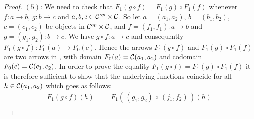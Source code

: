 \begin{proof}
    $(5)$: We need to check that $F_{1}(g\circ f)=F_{1}(g)\circ F_{1}(f)$ 
    whenever $f:a\to b$, $g:b\to c$ and $a,b,c\in\mbox{${\cal C}^{op}$}\times\mbox{$\cal C$}$. So let
    $a=(a_{1},a_{2})$, $b=(b_{1},b_{2})$, $c=(c_{1},c_{2})$ be objects
    in $\mbox{${\cal C}^{op}$}\times\mbox{$\cal C$}$, and $f=(f_{1},f_{1}):a\to b$ and $g=(g_{1},g_{2}):
    b\to c$. We have $g\circ f:a \to c$ and consequently $F_{1}(g\circ f):
    F_{0}(a)\to F_{0}(c)$. Hence the arrows $F_{1}(g\circ f)$ and
    $F_{1}(g)\circ F_{1}(f)$ are two arrows in \Set, with domain
    $F_{0}(a)=\mbox{$\cal C$}(a_{1},a_{2})$ and codomain $F_{0}(c)=\mbox{$\cal C$}(c_{1},c_{2})$.
    In order to prove the equality $F_{1}(g\circ f)=F_{1}(g)\circ F_{1}(f)$
    it is therefore sufficient to show that the underlying functions
    coincide for all $h\in\mbox{$\cal C$}(a_{1},a_{2})$ which goes as follows:
        \begin{eqnarray*}F_{1}(g\circ f)(h)
            &=&F_{1}(\,(g_{1},g_{2})\,\circ\,(f_{1},f_{2})\,)(h)\\
        \end{eqnarray*}
\end{proof}
